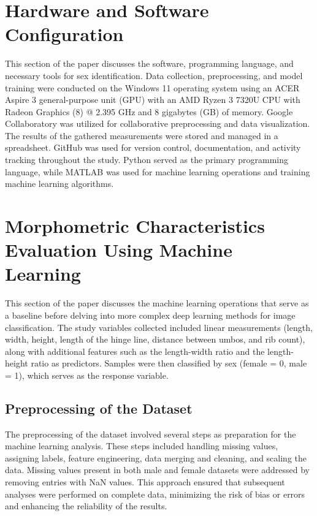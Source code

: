 \section{Hardware and Software Configuration}
This section of the paper discusses the software, programming language, and necessary tools for sex identification. Data collection, preprocessing, and model training were conducted on the Windows 11 operating system using an ACER Aspire 3 general-purpose unit (GPU) with an AMD Ryzen 3 7320U CPU with Radeon Graphics (8) @ 2.395 GHz and 8 gigabytes (GB) of memory. Google Collaboratory was utilized for collaborative preprocessing and data visualization. The results of the gathered measurements were stored and managed in a spreadsheet. GitHub was used for version control, documentation, and activity tracking throughout the study. Python served as the primary programming language, while MATLAB was used for machine learning operations and training machine learning algorithms.


\section{Morphometric Characteristics Evaluation Using Machine Learning }
\label{sec:ml models}

This section of the paper discusses the machine learning operations that serve as a baseline before delving into more complex deep learning methods for image classification. The study variables collected included linear measurements (length, width, height, length of the hinge line, distance between umbos, and rib count), along with additional features such as the length-width ratio and the length-height ratio as predictors. Samples were then classified by sex (female = 0, male = 1), which serves as the response variable.

\subsection{Preprocessing of the Dataset}
\label{sec:pre-processing}

The preprocessing of the dataset involved several steps as preparation for the machine learning analysis. These steps included handling missing values, assigning labels, feature engineering, data merging and cleaning, and scaling the data. Missing values present in both male and female datasets were addressed by removing entries with NaN values. This approach ensured that subsequent analyses were performed on complete data, minimizing the risk of bias or errors and enhancing the reliability of the results.


